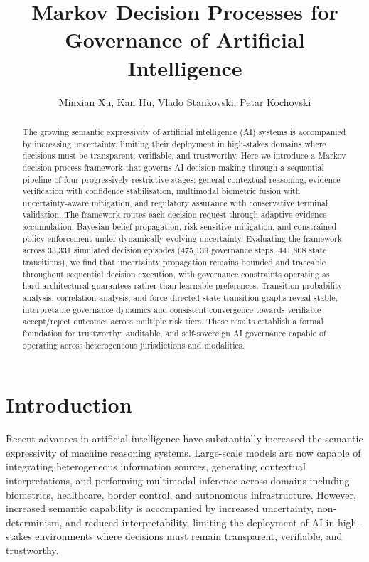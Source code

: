 \documentclass{article}
\title{Markov Decision Processes for Governance of Artificial Intelligence}
\author{Minxian Xu, Kan Hu, Vlado Stankovski, Petar Kochovski}
\begin{document}
\maketitle

\begin{abstract}
The growing semantic expressivity of artificial intelligence (AI) systems is accompanied by increasing uncertainty, limiting their deployment in high-stakes domains where decisions must be transparent, verifiable, and trustworthy. Here we introduce a Markov decision process framework that governs AI decision-making through a sequential pipeline of four progressively restrictive stages: general contextual reasoning, evidence verification with confidence stabilisation, multimodal biometric fusion with uncertainty-aware mitigation, and regulatory assurance with conservative terminal validation. The framework routes each decision request through adaptive evidence accumulation, Bayesian belief propagation, risk-sensitive mitigation, and constrained policy enforcement under dynamically evolving uncertainty. Evaluating the framework across 33,331 simulated decision episodes (475,139 governance steps, 441,808 state transitions), we find that uncertainty propagation remains bounded and traceable throughout sequential decision execution, with governance constraints operating as hard architectural guarantees rather than learnable preferences. Transition probability analysis, correlation analysis, and force-directed state-transition graphs reveal stable, interpretable governance dynamics and consistent convergence towards verifiable accept/reject outcomes across multiple risk tiers. These results establish a formal foundation for trustworthy, auditable, and self-sovereign AI governance capable of operating across heterogeneous jurisdictions and modalities.
\end{abstract}

\section{Introduction}

Recent advances in artificial intelligence have substantially increased the semantic expressivity of machine reasoning systems. Large-scale models are now capable of integrating heterogeneous information sources, generating contextual interpretations, and performing multimodal inference across domains including biometrics, healthcare, border control, and autonomous infrastructure. However, increased semantic capability is accompanied by increased uncertainty, non-determinism, and reduced interpretability, limiting the deployment of AI in high-stakes environments where decisions must remain transparent, verifiable, and trustworthy.
\end{document}
